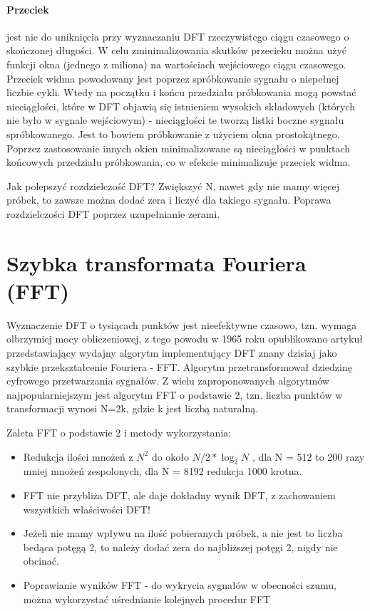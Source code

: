 \documentclass[a4paper,twoside]{report}
\begin{document}
\paragraph{Przeciek}
jest nie do uniknięcia przy wyznaczaniu DFT rzeczywistego ciągu czasowego o skończonej długości.
W celu zminimalizowania skutków przecieku można użyć funkcji okna (jednego z miliona) na wartościach wejściowego ciągu czasowego.
Przeciek widma powodowany jest poprzez spróbkowanie sygnału o niepełnej liczbie cykli. Wtedy na początku i końcu przedziału próbkowania mogą powstać nieciągłości, które w DFT objawią się istnieniem wysokich składowych (których nie było w sygnale wejściowym) - nieciągłości te tworzą listki boczne sygnału spróbkowanego. Jest to bowiem próbkowanie z użyciem okna prostokątnego. Poprzez zastosowanie innych okien minimalizowane są nieciągłości w punktach końcowych przedziału próbkowania, co w efekcie minimalizuje przeciek widma.

Jak polepszyć rozdzielczość DFT? Zwiększyć N, nawet gdy nie mamy więcej próbek, to zawsze można dodać zera i liczyć dla takiego sygnału. 
Poprawa rozdzielczości DFT poprzez uzupełnianie zerami.

\section{Szybka transformata Fouriera (FFT)}
Wyznaczenie DFT o tysiącach punktów jest nieefektywne czasowo, tzn. wymaga olbrzymiej mocy obliczeniowej, z tego powodu w 1965 roku opublikowano artykuł przedstawiający wydajny algorytm implementujący DFT znany dzisiaj jako szybkie przekształcenie Fouriera  - FFT. Algorytm przetransformował dziedzinę cyfrowego przetwarzania sygnałów.
Z wielu zaproponowanych algorytmów najpopularniejszym jest algorytm FFT o podstawie 2, tzn. liczba punktów w transformacji wynosi N=2k, gdzie k jest liczbą naturalną.

Zaleta FFT o podstawie 2 i metody wykorzystania:
\begin{itemize}
	\item Redukcja ilości mnożeń z $ N^2 $ do około $ N/2*\log_2 N $ , dla N = 512 to 200 razy mniej mnożeń zespolonych, dla N = 8192 redukcja 1000 krotna. 
	\item FFT nie przybliża DFT, ale daje dokładny wynik DFT, z zachowaniem wszystkich właściwości DFT! 
	\item Jeżeli nie mamy wpływu na ilość pobieranych próbek, a nie jest to liczba bedąca potęgą 2, to należy dodać zera do najbliższej potęgi 2, nigdy nie obcinać.
	\item Poprawianie wyników FFT - do wykrycia sygnałów w obecności szumu, można wykorzystać uśrednianie kolejnych procedur FFT
\end{itemize}
\end{document}
